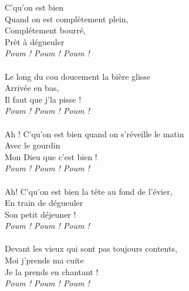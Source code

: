 
 C'qu'on est bien
\\Quand on est complètement plein,
\\Complétement bourré,
\\Prêt à dégueuler
\\\textit{Poum ! Poum ! Poum !}
\\\\Le long du cou doucement la bière glisse
\\Arrivée en bas,
\\Il faut que j'la pisse !
\\\textit{Poum ! Poum ! Poum !}
\\\\Ah ! C'qu'on est bien quand on s'réveille le matin
\\Avec le gourdin
\\Mon Dieu que c'est bien !
\\\textit{Poum ! Poum ! Poum !}
\\\\Ah! C'qu'on est bien la tête au fond de l'évier,
\\En train de dégueuler
\\Son petit déjeuner !
\\\textit{Poum ! Poum ! Poum !}
\\\\Devant les vieux qui sont pas toujours contents,
\\Moi j'prends ma cuite 
\\Je la prends en chantant !
\\\textit{Poum ! Poum ! Poum !}

\breakpage